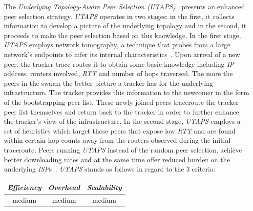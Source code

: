 The \emph{Underlying Topology-Aware Peer Selection (UTAPS)}~\cite{LCY2008}
presents an enhanced peer selection strategy. 
\emph{UTAPS} operates in two stages: in the first,
it collects information to develop a picture of the underlying topology 
and in the second, it proceeds to make the peer selection based on 
this knowledge. In the first stage, \emph{UTAPS} employs
network tomography, a technique that probes from a large network's 
endpoints to infer its internal characteristics~\cite{chny_tomography_2002}. 
Upon arrival of a new peer, the tracker trace-routes 
it to obtain some basic knowledge 
including \emph{IP} address, routers involved, \emph{RTT} and number of 
hops traversed.
The more the peers in the swarm the better 
picture a tracker has for the underlying infrastructure.  
The tracker provides this information to the newcomer in the form
of the bootstrapping peer list. 
These newly joined peers traceroute the tracker
peer list themselves and return back to the tracker in order to further enhance
the tracker's view of the infrastructure.
In the second stage, \emph{UTAPS} employs a set of heuristics
which target those peers that expose low \emph{RTT} and are found within
certain hop-counts away from
the routers observed during the initial traceroute.
Peers running \emph{UTAPS}
instead of the random peer selection, achieve better downloading rates
and at the same time offer reduced burden on the underlying \emph{ISP}s~\cite{LCY2008}. 
\emph{UTAPS} stands as follows in regard to the $3$ criteria:
\begin{center}
{\footnotesize
\begin{tabular}{ccc}
\emph{Efficiency} & \emph{Overhead} & \emph{Scalability} \\
\hline
medium &
medium &
%
medium
\end{tabular}
}
\end{center}

